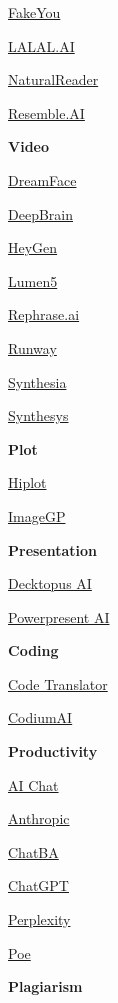 \documentclass[
]{book}
\begin{document}
\href{https://fakeyou.com/}{FakeYou}

\href{http://LALAL.AIhttps://www.lalal.ai/?gad_source=1\&gclid=Cj0KCQjwk6SwBhDPARIsAJ59Gwe8R6D_cisJF45mTx4pgQz01WhtUM2gqvDKZGUDPRqT4sIvC4rC2y4aAiX3EALw_wcB}{LALAL.AI}

\href{https://www.naturalreaders.com/}{NaturalReader}

\href{https://www.resemble.ai/}{Resemble.AI}

\textbf{Video}

\href{https://dreamfaceapp.com/}{DreamFace}

\href{https://www.deepbrain.io/}{DeepBrain}

\href{https://www.heygen.com/}{HeyGen}

\href{https://lumen5.com/}{Lumen5}

\href{https://www.rephrase.ai/}{Rephrase.ai}

\href{https://runwayml.com/}{Runway}

\href{https://www.synthesia.io/}{Synthesia}

\href{https://synthesys.io/}{Synthesys}

\textbf{Plot}

\href{https://hiplot.com.cn/home/index.en.html}{Hiplot}

\href{https://www.bic.ac.cn/ImageGP/}{ImageGP}

\textbf{Presentation}

\href{https://www.decktopus.com/?gad_source=1\&gclid=Cj0KCQjwk6SwBhDPARIsAJ59Gwc4xWCC-ZY81-gYiYl_NSnhkTYhHrSkNBFMRRkgU9aTMm5EjFl7ZigaAnutEALw_wcB}{Decktopus AI}

\href{https://powerpresent.ai/}{Powerpresent AI}

\textbf{Coding}

\href{https://ai-code-translator.vercel.app/}{Code Translator}

\href{https://codeium.com/}{CodiumAI}

\textbf{Productivity}

\href{https://deepai.org/chat}{AI Chat}

\href{https://claude.ai/login?returnTo=\%2F}{Anthropic}

\href{https://www.chatba.com/}{ChatBA}

\href{https://chat.openai.com/}{ChatGPT}

\href{https://www.perplexity.ai/}{Perplexity}

\href{https://poe.com/login}{Poe}

\textbf{Plagiarism}
\end{document}
